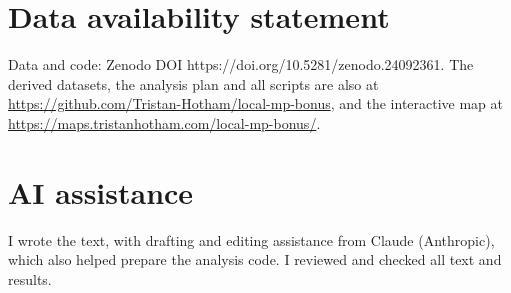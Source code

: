 \documentclass[11pt,a4paper]{article}
\begin{document}
\section*{Data availability statement}
Data and code: Zenodo DOI https://doi.org/10.5281/zenodo.24092361. The derived datasets, the analysis plan and all scripts are also at \url{https://github.com/Tristan-Hotham/local-mp-bonus}, and the interactive map at \url{https://maps.tristanhotham.com/local-mp-bonus/}.

\section*{AI assistance}
I wrote the text, with drafting and editing assistance from Claude (Anthropic), which also helped prepare the analysis code. I reviewed and checked all text and results.
\end{document}
